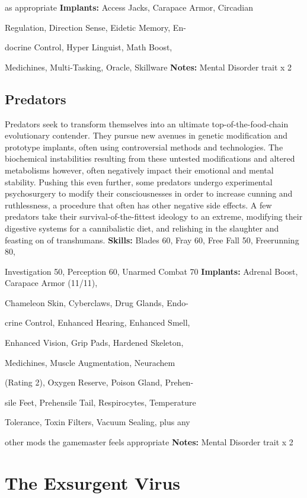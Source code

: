 as appropriate
\textbf{Implants:} Access Jacks, Carapace Armor, Circadian 

Regulation, Direction Sense, Eidetic Memory, En-

docrine Control, Hyper Linguist, Math Boost, 

Medichines, Multi-Tasking, Oracle, Skillware
\textbf{Notes:} Mental Disorder trait x 2

\subsection{Predators}

Predators seek to transform themselves into an ultimate
top-of-the-food-chain evolutionary contender.
They pursue new avenues in genetic modification and 
prototype implants, often using controversial methods 
and technologies. The biochemical instabilities resulting 
from these untested modifications and altered metabolisms
however, often negatively impact their emotional
and mental stability. Pushing this even further, some 
predators undergo experimental psychosurgery to 
modify their consciousnesses in order to increase cunning
and ruthlessness, a procedure that often has other
negative side effects. A few predators take their survival-of-the-fittest
ideology to an extreme, modifying their
digestive systems for a cannibalistic diet, and relishing 
in the slaughter and feasting on of transhumans.
\textbf{Skills:} Blades 60, Fray 60, Free Fall 50, Freerunning 80, 

Investigation 50, Perception 60, Unarmed Combat 70
\textbf{Implants:} Adrenal Boost, Carapace Armor (11/11), 

Chameleon Skin, Cyberclaws, Drug Glands, Endo-

crine Control, Enhanced Hearing, Enhanced Smell, 

Enhanced Vision, Grip Pads, Hardened Skeleton, 

Medichines, Muscle Augmentation, Neurachem 

(Rating 2), Oxygen Reserve, Poison Gland, Prehen-

sile Feet, Prehensile Tail, Respirocytes, Temperature 

Tolerance, Toxin Filters, Vacuum Sealing, plus any 

other mods the gamemaster feels appropriate
\textbf{Notes:} Mental Disorder trait x 2

\section{The Exsurgent Virus }

